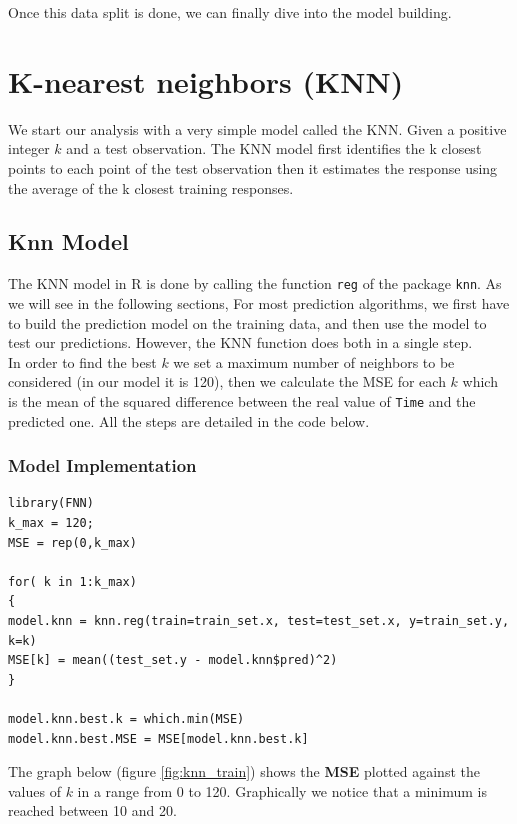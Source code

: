 \documentclass[]{report}
\begin{document}
Once this data split is done, we can finally dive into the model building.

\section{K-nearest neighbors (KNN)}
We start our analysis with a very simple model called the KNN.
Given a positive integer $k$ and a test observation. The KNN model first identifies the k closest points to each point of the test observation then it estimates the response using the average of the k closest training responses.\\ 

\subsection{Knn Model}
The KNN model in R is done by calling the function \texttt{reg} of the package \texttt{knn}. As we will see in the following sections, For most prediction algorithms, we first have to build the prediction model on the training data, and then use the model to test our predictions. However, the KNN function does both in a single step.\\ 
In order to find the best $k$ we set a maximum number of neighbors to be considered (in our model it is 120), then we calculate the MSE for each $k$ which is the mean of the squared difference between the real value of \texttt{Time} and the predicted one. All the steps are detailed in the code below.

\subsubsection{Model Implementation}
\begin{lstlisting}
library(FNN)
k_max = 120;
MSE = rep(0,k_max)

for( k in 1:k_max)
{
model.knn = knn.reg(train=train_set.x, test=test_set.x, y=train_set.y, k=k)
MSE[k] = mean((test_set.y - model.knn$pred)^2)
}

model.knn.best.k = which.min(MSE)
model.knn.best.MSE = MSE[model.knn.best.k] 
\end{lstlisting}
 
The graph below (figure \ref{fig:knn_train}) shows the \textbf{ MSE} plotted against the values of $k$ in a range from 0 to 120. Graphically we notice that a minimum is reached between 10 and 20.
\end{document}
